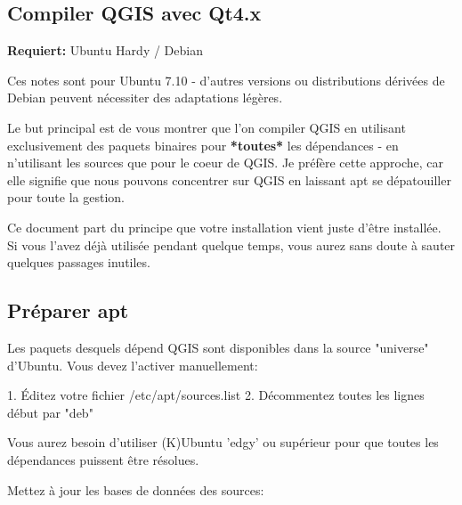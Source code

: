 \subsection{Compiler QGIS avec Qt4.x}
\textbf{Requiert:} Ubuntu Hardy / Debian

Ces notes sont pour Ubuntu 7.10 - d'autres versions ou distributions d\'eriv\'ees de Debian peuvent n\'ecessiter des adaptations l\'eg\`eres.

Le but principal est de vous montrer que l'on compiler QGIS en utilisant exclusivement des paquets binaires pour \textbf{*toutes*} les d\'ependances - en n'utilisant les sources que pour le coeur de QGIS. Je pr\'ef\`ere cette approche, car elle signifie que nous pouvons concentrer sur QGIS en laissant apt se d\'epatouiller pour toute la gestion.

Ce document part du principe que votre installation vient juste d'\^etre install\'ee. Si vous l'avez d\'ej\`a utilis\'ee pendant quelque temps, vous aurez sans doute \`a sauter quelques passages inutiles.

% 
% 
% 
% 

\subsection{Pr\'eparer apt}
Les paquets desquels d\'epend QGIS sont disponibles dans la source "universe" d'Ubuntu. Vous devez l'activer manuellement:

1. \'Editez votre fichier /etc/apt/sources.list   
2. D\'ecommentez toutes les lignes d\'ebut par "deb"

Vous aurez besoin d'utiliser (K)Ubuntu 'edgy' ou sup\'erieur pour que toutes les d\'ependances puissent \^etre r\'esolues.

Mettez \`a jour les bases de donn\'ees des sources:

